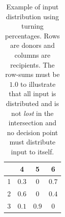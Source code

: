 \begin{table}[!ht]
\begin{center}
\begin{tabular}{l|ccc}
 	& 4 & 5 & 6 \\ \hline
1	& $0.3$ & 0 & $0.7$ \\
2	& $0.6$ & 0 & $0.4$ \\
3	& $0.1$ & $0.9$ & 0
\end{tabular}
\end{center}
\caption{Example of input distribution using turning percentages. Rows are donors and columns are recipients. The row-sums must be $1.0$ to illustrate that all input is distributed and is not \textit{lost} in the intersection and no decision point must distribute input to itself.}
\label{tbl:flow_dist_principle}
\end{table}

